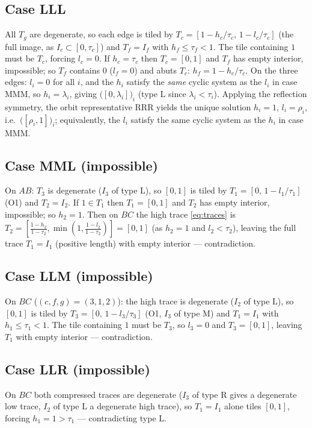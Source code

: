 \documentclass[11pt,reqno]{amsart}
\theoremstyle{plain}
\theoremstyle{definition}
\theoremstyle{remark}
\begin{document}
\subsection*{Case LLL}
All $T_g$ are degenerate, so each edge is tiled by
$T_c=[1-h_c/\tau_c,\,1-l_c/\tau_c]$ (the full image, as $I_c\subset[0,\tau_c]$)
and $T_f=I_f$ with $h_f\le\tau_f<1$. The tile containing $1$ must be $T_c$,
forcing $l_c=0$. If $h_c=\tau_c$ then $T_c=[0,1]$ and $T_f$ has empty interior,
impossible; so $T_f$ contains $0$ ($l_f=0$) and abuts $T_c$:
$h_f=1-h_c/\tau_c$. On the three edges: $l_i=0$ for all $i$, and the $h_i$
satisfy the \emph{same} cyclic system as the $l_i$ in case MMM, so
$h_i=\lambda_i$, giving $\bigl([0,\lambda_i]\bigr)_i$ (type $\mathrm L$ since
$\lambda_i<\tau_i$). Applying the reflection symmetry, the orbit representative
RRR yields the unique solution $h_i=1$, $l_i=\rho_i$, i.e.\
$\bigl([\rho_i,1]\bigr)_i$; equivalently, the $l_i$ satisfy the same cyclic
system as the $h_i$ in case MMM.

\subsection*{Case MML \textup(impossible\textup)}
On $AB$: $T_3$ is degenerate ($I_3$ of type $\mathrm L$), so $[0,1]$ is tiled
by $T_1=[0,\,1-l_1/\tau_1]$ (O1) and $T_2=I_2$. If $1\in T_1$ then $T_1=[0,1]$
and $T_2$ has empty interior, impossible; so $h_2=1$. Then on $BC$ the high
trace \eqref{eq:traces} is
$T_2=[\tfrac{1-h_2}{1-\tau_2},\min(1,\tfrac{1-l_2}{1-\tau_2})]=[0,1]$ (as
$h_2=1$ and $l_2<\tau_2$), leaving the full trace $T_1=I_1$ (positive length)
with empty interior --- contradiction.

\subsection*{Case LLM \textup(impossible\textup)}
On $BC$ ($(c,f,g)=(3,1,2)$): the high trace is degenerate ($I_2$ of type
$\mathrm L$), so $[0,1]$ is tiled by $T_3=[0,\,1-l_3/\tau_3]$ (O1, $I_3$ of
type $\mathrm M$) and $T_1=I_1$ with $h_1\le\tau_1<1$. The tile containing $1$
must be $T_3$, so $l_3=0$ and $T_3=[0,1]$, leaving $T_1$ with empty interior
--- contradiction.

\subsection*{Case LLR \textup(impossible\textup)}
On $BC$ both compressed traces are degenerate ($I_3$ of type $\mathrm R$ gives
a degenerate low trace, $I_2$ of type $\mathrm L$ a degenerate high trace), so
$T_1=I_1$ alone tiles $[0,1]$, forcing $h_1=1>\tau_1$ --- contradicting type
$\mathrm L$.
\end{document}
